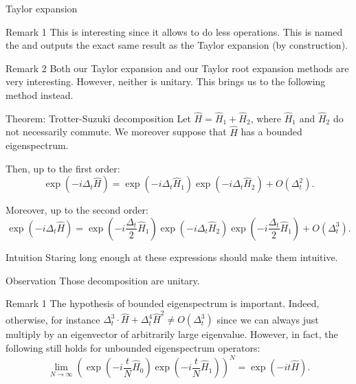 \documentclass[a4paper]{article}
\begin{document}
\begin{parag}{Taylor expansion}
\begin{subparag}{Remark 1}
        This is interesting since it allows to do less operations. This is named the  and outputs the exact same result as the Taylor expansion (by construction).
    \end{subparag}

    \begin{subparag}{Remark 2}
        Both our Taylor expansion and our Taylor root expansion methods are very interesting. However, neither is unitary. This brings us to the following method instead.
    \end{subparag}
\end{parag}

\begin{parag}{Theorem: Trotter-Suzuki decomposition}
    Let $\hat{H} = \hat{H}_1 + \hat{H}_2$, where $\hat{H}_1$ and $\hat{H}_2$ do not necessarily commute. We moreover suppose that $\hat{H}$ has a bounded eigenspectrum.

    Then, up to the first order: 
    \[\exp\left(-i \Delta_t \hat{H}\right) = \exp\left(-i\Delta_t \hat{H}_1\right) \exp\left(-i \Delta_t \hat{H}_2\right) + O\left(\Delta_t^2\right).\]
    
    Moreover, up to the second order: 
    \[\exp\left(-i \Delta_t \hat{H}\right) = \exp\left(-i \frac{\Delta_t}{2} \hat{H}_1\right) \exp\left(-i \Delta_t \hat{H}_2\right) \exp\left(-i\frac{\Delta_t}{2} \hat{H}_1\right) + O\left(\Delta_t^3\right).\]

    \begin{subparag}{Intuition}
        Staring long enough at these expressions should make them intuitive.
    \end{subparag}

    \begin{subparag}{Observation}
        Those decomposition are unitary.
    \end{subparag}

    \begin{subparag}{Remark 1}
        The hypothesis of bounded eigenspectrum is important. Indeed, otherwise, for instance $\Delta_{t}^3\cdot  \hat{H} + \Delta_t^4 \hat{H}^2 \neq O\left(\Delta_t^3\right)$ since we can always just multiply by an eigenvector of arbitrarily large eigenvalue.  However, in fact, the following still holds for unbounded eigenspectrum operators: 
        \[\lim_{N \to \infty} \left(\exp\left(-i\frac{t}{N} \hat{H}_0\right) \exp\left(-i\frac{t}{N} \hat{H}_1\right)\right)^N = \exp\left(-it \hat{H}\right).\]
    \end{subparag}


\end{parag}
\end{document}
